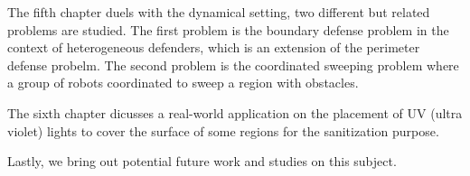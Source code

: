 \begin{my_abstract}
The fifth chapter duels with the dynamical setting, two different but related problems are studied. 
The first problem is the boundary defense problem in the context of heterogeneous defenders,
which is an extension of the perimeter defense probelm. 
The second problem is the coordinated sweeping problem where a group of robots coordinated to sweep a region with obstacles. 

The sixth chapter dicusses a real-world application on the placement of UV (ultra violet) lights
to cover the surface of some regions for the sanitization purpose. 

Lastly, we bring out potential future work and studies on this subject.

\end{my_abstract}
